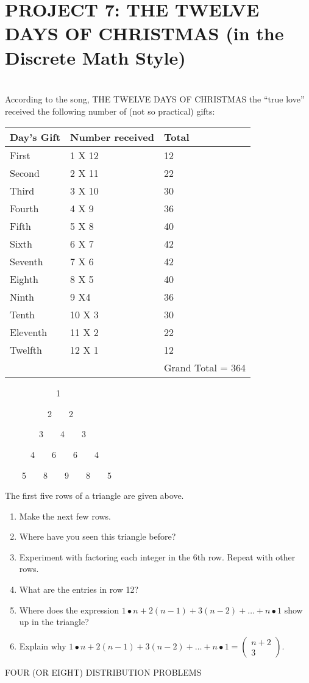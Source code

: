 \documentclass{article}
\begin{document}
\section[PROJECT 7: THE TWELVE DAYS OF CHRISTMAS (in the Discrete Math Style)]{PROJECT 7: THE TWELVE DAYS OF CHRISTMAS
(in the Discrete Math Style)}
\section{}
According to the song, THE TWELVE DAYS OF CHRISTMAS the “true love” received the following number of (not so practical)
gifts:

\begin{flushleft}
\tablefirsthead{}
\tablehead{}
\tabletail{}
\tablelasttail{}
\begin{supertabular}{m{0.90875983in}m{1.3531599in}m{2.13866in}}
Day’s Gift &
Number received &
Total\\\hline
First &
1 X 12 &
12\\
Second &
2 X 11 &
22\\
Third &
3 X 10 &
30\\
Fourth &
4 X 9 &
36\\
Fifth &
5 X 8 &
40\\
Sixth &
6 X 7 &
42\\
Seventh &
7 X 6 &
42\\
Eighth &
8 X 5 &
40\\
Ninth &
9 X4 &
36\\
Tenth &
10 X 3 &
30\\
Eleventh &
11 X 2 &
22\\
Twelfth &
12 X 1 &
12\\
 &
 &
Grand Total = 364\\
\end{supertabular}
\end{flushleft}
\ \ \ \ \ \ \ \ \ \ \ \ 1

\ \ \ \ \ \ \ \ \ \ 2\ \ \ \ 2

\ \ \ \ \ \ \ \ 3\ \ \ \ 4\ \ \ \ 3

\ \ \ \ \ \ 4\ \ \ \ 6\ \ \ \ 6\ \ \ \ 4

\ \ \ \ 5\ \ \ \ 8\ \ \ \ 9\ \ \ \ 8\ \ \ \ 5

The first five rows of a triangle are given above. 

\begin{enumerate}
\item Make the next few rows. 
\item Where have you seen this triangle before?
\item Experiment with factoring each integer in the 6th row. Repeat with other rows. 
\item What are the entries in row 12?
\item Where does the expression  $1{\bullet}n+2\left(n-1\right)+3\left(n-2\right)+{\dots}+n{\bullet}1$ show up in the
triangle?
\item Explain why 
$1{\bullet}n+2\left(n-1\right)+3\left(n-2\right)+{\dots}+n{\bullet}1=\left(\begin{matrix}n+2\\3\end{matrix}\right)$.
\end{enumerate}
FOUR (OR EIGHT) DISTRIBUTION PROBLEMS
\end{document}
